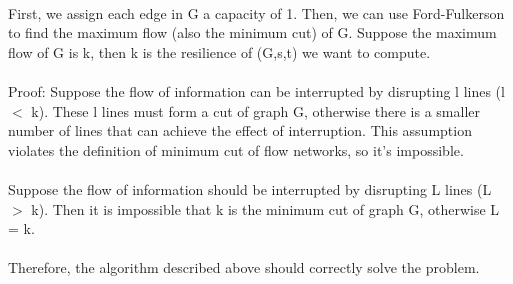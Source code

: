\begin{problem}{4} ~\\
First, we assign each edge in G a capacity of 1. Then, we can use Ford-Fulkerson to find the maximum flow (also the minimum cut) of G. Suppose the maximum flow of G is k, then k is the resilience of (G,s,t) we want to compute.\\
\\
Proof: Suppose the flow of information can be interrupted by disrupting l lines (l $<$ k). These l lines must form a cut of graph G, otherwise there is a smaller number of lines that can achieve the effect of interruption. This assumption violates the definition of minimum cut of flow networks, so it's impossible.\\
\\
Suppose the flow of information should be interrupted by disrupting L lines (L $>$ k). Then it is impossible that k is the minimum cut of graph G, otherwise L = k.\\
\\
Therefore, the algorithm described above should correctly solve the problem.
\end{problem}